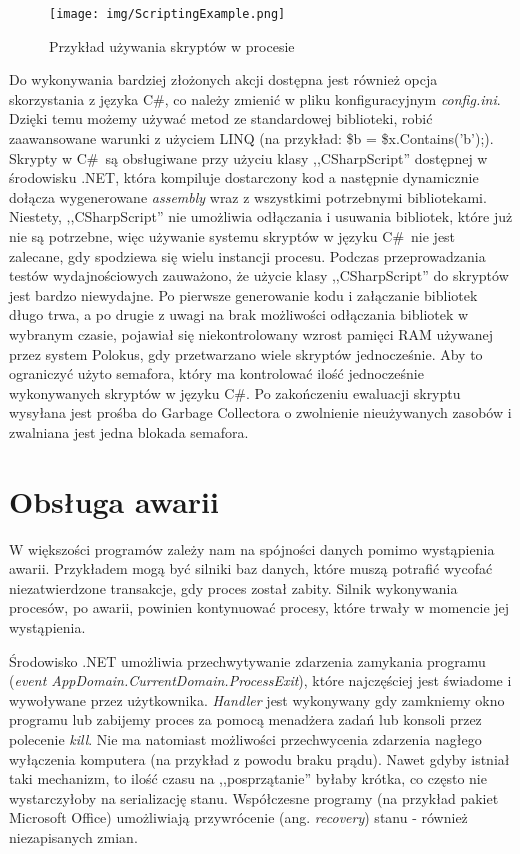 \documentclass[declaration,shortabstract,mgr]{iithesis}
\newcommand{\cs}{C\#}
\begin{document}
\begin{figure}[H]
    \texttt{[image: img/ScriptingExample.png]}
    \caption{Przykład używania skryptów w procesie}
    \label{fig:process-example-scripts}
\end{figure}

Do wykonywania bardziej złożonych akcji dostępna jest również opcja skorzystania z języka \cs, co należy zmienić w pliku konfiguracyjnym \textit{config.ini}. Dzięki temu możemy używać metod ze standardowej biblioteki, robić zaawansowane warunki z użyciem LINQ (na przykład: \$b = \$x.Contains('b');). Skrypty w \cs\ są obsługiwane przy użyciu klasy ,,CSharpScript'' dostępnej w środowisku .NET, która kompiluje dostarczony kod a następnie dynamicznie dołącza wygenerowane \textit{assembly} wraz z wszystkimi potrzebnymi bibliotekami. Niestety, ,,CSharpScript'' nie umożliwia odłączania i usuwania bibliotek, które już nie są potrzebne, więc używanie systemu skryptów w języku \cs\ nie jest zalecane, gdy spodziewa się wielu instancji procesu. Podczas przeprowadzania testów wydajnościowych zauważono, że użycie klasy ,,CSharpScript'' do skryptów jest bardzo niewydajne. Po pierwsze generowanie kodu i załączanie bibliotek długo trwa, a po drugie z uwagi na brak możliwości odłączania bibliotek w wybranym czasie, pojawiał się niekontrolowany wzrost pamięci RAM używanej przez system Polokus, gdy przetwarzano wiele skryptów jednocześnie. Aby to ograniczyć użyto semafora, który ma kontrolować ilość jednocześnie wykonywanych skryptów w języku \cs. Po zakończeniu ewaluacji skryptu wysyłana jest prośba do Garbage Collectora o zwolnienie nieużywanych zasobów i zwalniana jest jedna blokada semafora.

\section{Obsługa awarii}

W większości programów zależy nam na spójności danych pomimo wystąpienia awarii. Przykładem mogą być silniki baz danych, które muszą potrafić wycofać niezatwierdzone transakcje, gdy proces został zabity. Silnik wykonywania procesów, po awarii, powinien kontynuować procesy, które trwały w momencie jej wystąpienia.

Środowisko .NET umożliwia przechwytywanie zdarzenia zamykania programu (\textit{event AppDomain.CurrentDomain.ProcessExit}), które najczęściej jest świadome i wywoływane przez użytkownika. \textit{Handler} jest wykonywany gdy zamkniemy okno programu lub zabijemy proces za pomocą menadżera zadań lub konsoli przez polecenie \textit{kill}. Nie ma natomiast możliwości przechwycenia zdarzenia nagłego wyłączenia komputera (na przykład z powodu braku prądu). Nawet gdyby istniał taki mechanizm, to ilość czasu na ,,posprzątanie'' byłaby krótka, co często nie wystarczyłoby na serializację stanu. Współczesne programy (na przykład pakiet Microsoft Office) umożliwiają przywrócenie (ang. \textit{recovery}) stanu - również niezapisanych zmian.
\end{document}
